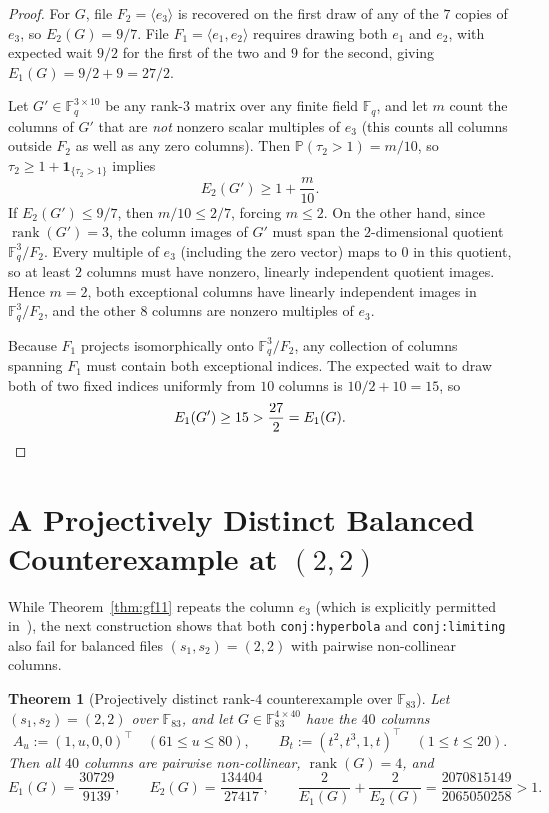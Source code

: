\documentclass[11pt]{article}
\theoremstyle{plain}
\newtheorem{theorem}{Theorem}
\theoremstyle{definition}
\theoremstyle{remark}
\DeclareMathOperator{\rank}{rank}
\begin{document}
\begin{proof}
For $G$, file $F_2 = \langle e_3 \rangle$ is recovered on the first draw of any of the $7$ copies of $e_3$, so $E_2(G) = 9/7$.
File $F_1 = \langle e_1, e_2 \rangle$ requires drawing both $e_1$ and $e_2$, with expected wait $9/2$ for the first of the two and $9$ for the second, giving $E_1(G) = 9/2 + 9 = 27/2$.

Let $G' \in \mathbb{F}_q^{3 \times 10}$ be any rank-$3$ matrix over any finite field $\mathbb{F}_q$, and let $m$ count the columns of $G'$ that are \emph{not} nonzero scalar multiples of $e_3$ (this counts all columns outside $F_2$ as well as any zero columns).
Then $\mathbb{P}(\tau_2 > 1) = m/10$, so $\tau_2 \ge 1 + \mathbf{1}_{\{\tau_2 > 1\}}$ implies
\[
E_2(G') \ge 1 + \frac{m}{10}.
\]
If $E_2(G') \le 9/7$, then $m/10 \le 2/7$, forcing $m \le 2$.
On the other hand, since $\rank(G') = 3$, the column images of $G'$ must span the $2$-dimensional quotient $\mathbb{F}_q^3 / F_2$.
Every multiple of $e_3$ (including the zero vector) maps to $0$ in this quotient, so at least $2$ columns must have nonzero, linearly independent quotient images.
Hence $m = 2$, both exceptional columns have linearly independent images in $\mathbb{F}_q^3 / F_2$, and the other $8$ columns are nonzero multiples of $e_3$.

Because $F_1$ projects isomorphically onto $\mathbb{F}_q^3 / F_2$, any collection of columns spanning $F_1$ must contain both exceptional indices.
The expected wait to draw both of two fixed indices uniformly from $10$ columns is $10/2 + 10 = 15$, so
\[
E_1(G') \ge 15 > \frac{27}{2} = E_1(G). \qedhere
\]
\end{proof}

\section{A Projectively Distinct Balanced Counterexample at \texorpdfstring{$(2,2)$}{(2,2)}}

While Theorem~\ref{thm:gf11} repeats the column $e_3$ (which is explicitly permitted in~\cite{BarLev2026}), the next construction shows that both \texttt{conj:hyperbola} and \texttt{conj:limiting} also fail for balanced files $(s_1, s_2) = (2, 2)$ with pairwise non-collinear columns.

\begin{theorem}[Projectively distinct rank-$4$ counterexample over $\mathbb{F}_{83}$]\label{thm:gf83}
Let $(s_1, s_2) = (2, 2)$ over $\mathbb{F}_{83}$, and let $G \in \mathbb{F}_{83}^{4 \times 40}$ have the $40$ columns
\[
A_u := (1, u, 0, 0)^\top \quad (61 \le u \le 80), \qquad
B_t := (t^2, t^3, 1, t)^\top \quad (1 \le t \le 20).
\]
Then all $40$ columns are pairwise non-collinear, $\rank(G) = 4$, and
\[
E_1(G) = \frac{30729}{9139}, \qquad
E_2(G) = \frac{134404}{27417}, \qquad
\frac{2}{E_1(G)} + \frac{2}{E_2(G)} = \frac{2070815149}{2065050258} > 1.
\]
\end{theorem}
\end{document}
